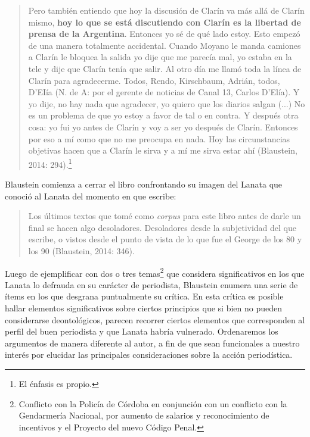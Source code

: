 {\begin{quote}
Pero también entiendo que hoy la discusión de Clarín va más allá de Clarín mismo, \textbf{hoy lo que se está discutiendo con Clarín es la libertad de prensa de la Argentina}. Entonces yo sé de qué lado estoy. Esto empezó de una manera totalmente accidental. Cuando Moyano le manda camiones a Clarín le bloquea la salida yo dije que me parecía mal, yo estaba en la tele y dije que Clarín tenía que salir. Al otro día me llamó toda la línea de Clarín para agradecerme. Todos, Rendo, Kirschbaum, Adrián, todos, D'EIía (N. de A: por el gerente de noticias de Canal 13, Carlos D'Elía). Y yo dije, no hay nada que agradecer, yo quiero que los diarios salgan (...) No es un problema de que yo estoy a favor de tal o en contra. Y después otra cosa: yo fui yo antes de Clarín y voy a ser yo después de Clarín. Entonces por eso a mí como que no me preocupa en nada. Hoy las circunstancias objetivas hacen que a Clarín le sirva y a mí me sirva estar ahí (Blaustein, 2014: 294).\footnote{El énfasis es propio.}
\end{quote}

Blaustein comienza a cerrar el libro confrontando su imagen del Lanata que conoció al Lanata del momento en que escribe:

\begin{quote}
Los últimos textos que tomé como \emph{corpus} para este libro antes de darle un final se hacen algo desoladores. Desoladores desde la subjetividad del que escribe, o vistos desde el punto de vista de lo que fue el George de los 80 y los 90 (Blaustein, 2014: 346).
\end{quote}

Luego de ejemplificar con dos o tres temas\footnote{Conflicto con la Policía de Córdoba en conjunción con un conflicto con la Gendarmería Nacional, por aumento de salarios y reconocimiento de incentivos y el Proyecto del nuevo Código Penal.} que considera significativos en los que Lanata lo defrauda en su carácter de periodista, Blaustein enumera una serie de ítems en los que desgrana puntualmente su crítica. En esta crítica es posible hallar elementos significativos sobre ciertos principios que si bien no pueden considerarse deontológicos, parecen recorrer ciertos elementos que corresponden al perfil del buen periodista y que Lanata habría vulnerado. Ordenaremos los argumentos de manera diferente al autor, a fin de que sean funcionales a nuestro interés por elucidar las principales consideraciones sobre la acción periodística.

}
